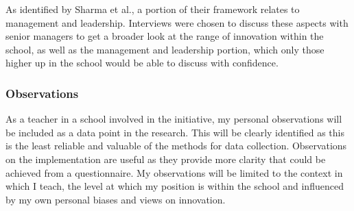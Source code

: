 As identified by Sharma et al., a portion of their framework relates to management and leadership. Interviews were chosen to discuss these aspects with senior managers to get a broader look at the range of innovation within the school, as well as the management and leadership portion, which only those higher up in the school would be able to discuss with confidence.

\subsubsection{Observations}

As a teacher in a school involved in the initiative, my personal observations will be included as a data point in the research. This will be clearly identified as this is the least reliable and valuable of the methods for data collection. Observations on the implementation are useful as they provide more clarity that could be achieved from a questionnaire. My observations will be limited to the context in which I teach, the level at which my position is within the school and influenced by my own personal biases and views on innovation. 

